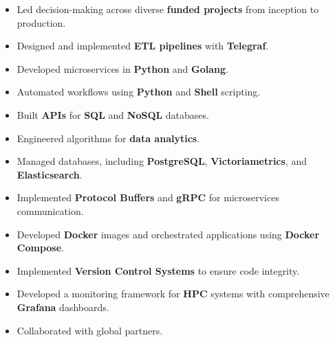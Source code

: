 \documentclass[10pt,a4paper,ragged2e,withhyper]{altacv}
\begin{document}
\begin{paracol}{2}
      \begin{itemize}
            \item Led decision-making across diverse \textcolor{heading}{\textbf{funded
                              projects}} from inception to production.
            \item Designed and implemented \textcolor{heading}{\textbf{ETL pipelines}} with
                  \textcolor{heading}{\textbf{Telegraf}}.
            \item Developed microservices in \textcolor{heading}{\textbf{Python}} and
                  \textcolor{heading}{\textbf{Golang}}.
            \item Automated workflows using \textcolor{heading}{\textbf{Python}} and
                  \textcolor{heading}{\textbf{Shell}} scripting.
            \item Built \textcolor{heading}{\textbf{APIs}} for \textcolor{heading}{\textbf{SQL}}
                  and \textcolor{heading}{\textbf{NoSQL}} databases.
            \item Engineered algorithms for \textcolor{heading}{\textbf{data analytics}}.
            \item Managed databases, including \textcolor{heading}{\textbf{PostgreSQL}},
                  \textcolor{heading}{\textbf{Victoriametrics}}, and
                  \textcolor{heading}{\textbf{Elasticsearch}}.
            \item Implemented \textcolor{heading}{\textbf{Protocol Buffers}} and
                  \textcolor{heading}{\textbf{gRPC}} for microservices communication.
            \item Developed \textcolor{heading}{\textbf{Docker}} images and orchestrated
                  applications using \textcolor{heading}{\textbf{Docker Compose}}.

            \item Implemented \textcolor{heading}{\textbf{Version Control Systems}} to ensure
                  code integrity.

            \item Developed a monitoring framework for \textcolor{heading}{\textbf{HPC}} systems
                  with comprehensive \textcolor{heading}{\textbf{Grafana}} dashboards.
            \item Collaborated with global partners.

      \end{itemize}



\end{paracol}
\end{document}
